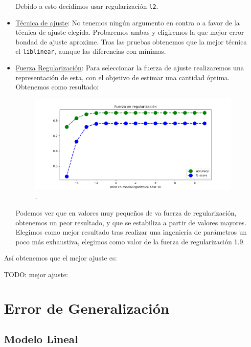 \documentclass[11pt,a4paper]{article}
\begin{document}
\begin{itemize}
Debido a esto decidimos usar regularización \texttt{l2}. 

\item \underline{Técnica de ajuste}: No tenemos ningún argumento en contra o a favor de la técnica de ajuste elegida. Probaremos ambas y eligiremos la que mejor error bondad de ajuste aproxime. Tras las pruebas obtenemos que la mejor técnica el \texttt{liblinear}, aunque las diferencias con mínimas.

\item \underline{Fuerza Regularización}:   Para seleccionar la fuerza de ajuste realizaremos una representación de esta, con el objetivo de estimar una cantidad óptima. Obtenemos como resultado:
    \begin{figure}[h!]
      \label{figure:outliers}
      \centering
      \includegraphics[width=\textwidth]{./figures/regularizacion_rl.png}
      \caption{.}
      \label{fig:outliers}
    \end{figure}




Podemos ver que en valores muy pequeños de va fuerza de regularización, obtenemos un peor resultado, y que se estabiliza a partir de valores mayores. Elegimos como mejor resultado tras realizar una ingeniería de parámetros un poco más exhaustiva, elegimos como valor de la fuerza de regularización 1.9.\\
\end{itemize}


Así obtenemos que el mejor ajuste es:

TODO: mejor ajuste:


\section{ Error de Generalización}
\subsection{Modelo Lineal}
\end{document}
